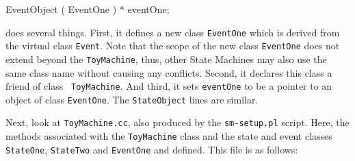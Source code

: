 \begin{codesegment}
  EventObject ( EventOne ) * eventOne;
\end{codesegment}

\noindent does several things. First, it defines a new class {\tt EventOne}
which is derived from the virtual class {\tt Event}. Note that the scope of the
new class {\tt EventOne} does not extend beyond the {\tt ToyMachine}, thus,
other State Machines may also use the same class name without causing any
conflicts. Second, it declares this class a friend of class {\tt
ToyMachine}. And third, it sets {\tt eventOne} to be a pointer to an object of
class {\tt EventOne}. The {\tt StateObject} lines are similar.

Next, look at {\tt ToyMachine.cc}, also produced by the {\tt sm-setup.pl}
script. Here, the methods associated with the {\tt ToyMachine} class and the
state and event classes {\tt StateOne}, {\tt StateTwo} and {\tt EventOne}
and defined. This file is as follows:

